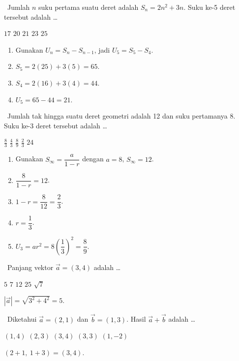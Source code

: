 \documentclass[11pt,a4paper]{exam}
\newenvironment{langkah}{%
  \begin{enumerate}[label=\textbf{Langkah \arabic*:},leftmargin=2.6em,
    itemsep=2pt,topsep=2pt]}{\end{enumerate}}
\newcommand{\Fund}{{\footnotesize\textsf{\textcolor{hijau}{[Fundamental]}}}\ }
\newcommand{\Adv}{{\footnotesize\textsf{\textcolor{oranye}{[Advanced]}}}\ }
\newcommand{\Exp}{{\footnotesize\textsf{\textcolor{ungu}{[Expert]}}}\ }
\newcommand{\topik}[1]{%
  \par\addvspace{14pt}%
  \noindent{\large\bfseries\color{biru}#1}\par\addvspace{6pt}}
\begin{document}
\begin{questions}
\question \Adv Jumlah $n$ suku pertama suatu deret adalah $S_n = 2n^{2} + 3n$.
Suku ke-5 deret tersebut adalah \dots
\begin{choices}
\choice $17$ \choice $20$ \CorrectChoice $21$ \choice $23$ \choice $25$
\end{choices}
\begin{solution}
\begin{langkah}
\item Gunakan $U_n = S_n - S_{n-1}$, jadi $U_5 = S_5 - S_4$.
\item $S_5 = 2(25)+3(5) = 65$.
\item $S_4 = 2(16)+3(4) = 44$.
\item $U_5 = 65 - 44 = 21$.
\end{langkah}
\end{solution}

\question \Exp Jumlah tak hingga suatu deret geometri adalah 12 dan suku
pertamanya 8. Suku ke-3 deret tersebut adalah \dots
\begin{choices}
\choice $\tfrac{8}{3}$ \choice $\tfrac{4}{3}$ \CorrectChoice $\tfrac{8}{9}$
\choice $\tfrac{2}{3}$ \choice $24$
\end{choices}
\begin{solution}
\begin{langkah}
\item Gunakan $S_\infty = \dfrac{a}{1-r}$ dengan $a=8$, $S_\infty=12$.
\item $\dfrac{8}{1-r} = 12$.
\item $1 - r = \dfrac{8}{12} = \dfrac{2}{3}$.
\item $r = \dfrac{1}{3}$.
\item $U_3 = ar^{2} = 8\left(\dfrac{1}{3}\right)^{2} = \dfrac{8}{9}$.
\end{langkah}
\end{solution}

\topik{3. Vektor (8 Soal)}

\question \Fund Panjang vektor $\vec{a} = (3,4)$ adalah \dots
\begin{choices}
\CorrectChoice $5$ \choice $7$ \choice $12$ \choice $25$ \choice $\sqrt{7}$
\end{choices}
\begin{solution}$|\vec{a}| = \sqrt{3^{2}+4^{2}} = 5.$\end{solution}

\question \Fund Diketahui $\vec{a} = (2,1)$ dan $\vec{b} = (1,3)$. Hasil $\vec{a} + \vec{b}$ adalah \dots
\begin{choices}
\choice $(1,4)$ \choice $(2,3)$ \CorrectChoice $(3,4)$ \choice $(3,3)$ \choice $(1,-2)$
\end{choices}
\begin{solution}$(2+1,\ 1+3) = (3,4).$\end{solution}


\end{questions}
\end{document}
